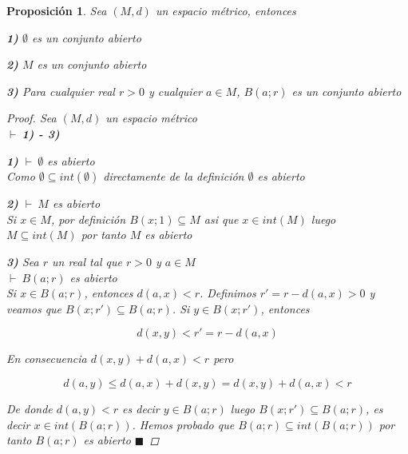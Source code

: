 \documentclass[oneside]{book} %
\theoremstyle{Teorema}
\newtheorem{Proposicion}[Definicion]{Proposición}
\theoremstyle{Ejemplos}
\theoremstyle{[Obs]}
\renewcommand{\{}{\left\lbrace} %
\renewcommand{\}}{\right\rbrace} %
\renewcommand{\sc}{\subseteq} %
\renewcommand{\qed}{$\blacksquare$} %
\newcommand{\pd}{$\vdash\ $} %
\begin{document}
			\begin{Proposicion}\setlength{\parindent}{0em}
				
				Sea $(M, d)$ un espacio métrico, entonces

				\textbf{1)} $\emptyset$ es un conjunto abierto 

				\textbf{2)} $M$ es un conjunto abierto 

				\textbf{3)} Para cualquier real $r > 0$ y cualquier $a \in M$, $B(a;r)$ es un conjunto abierto 

				\begin{proof}
					
					Sea $(M, d)$ un espacio métrico \\ 
					\pd \textbf{1) - 3)} 

					\textbf{1)} \pd $\emptyset$ es abierto \\ 
					Como $\emptyset \sc int(\emptyset)$ directamente de la definición $\emptyset$ es abierto 

					\textbf{2)} \pd $M$ es abierto \\ 
					Si $x \in M$, por definición $B(x;1) \sc M$ asi que $x \in int(M)$ luego $M \sc int(M)$ por tanto $M$ es abierto 

					\textbf{3)} Sea $r$ un real tal que $r > 0$ y $a \in M$ \\ 
					\pd $B(a;r)$ es abierto \\ 
					Si $x \in B(a;r)$, entonces $d(a, x) < r$. Definimos $r' = r - d(a, x) > 0$ y veamos que $B(x;r') \sc B(a;r)$. Si $y \in B(x;r')$, entonces 
					
					\[ d(x, y) < r' = r - d(a, x) \]

					En consecuencia $d(x, y) + d(a, x) < r$ pero 

					\[ d(a, y) \leq d(a, x) + d(x, y) = d(x, y) + d(a, x) < r \] 

					De donde $d(a, y) < r$ es decir $y \in B(a;r)$ luego $B(x;r') \sc B(a;r)$, es decir $x \in int(B(a;r))$. Hemos probado que $B(a;r) \sc int(B(a;r))$ por tanto $B(a;r)$ es abierto \qed

				\end{proof}

			\end{Proposicion}
\end{document}
